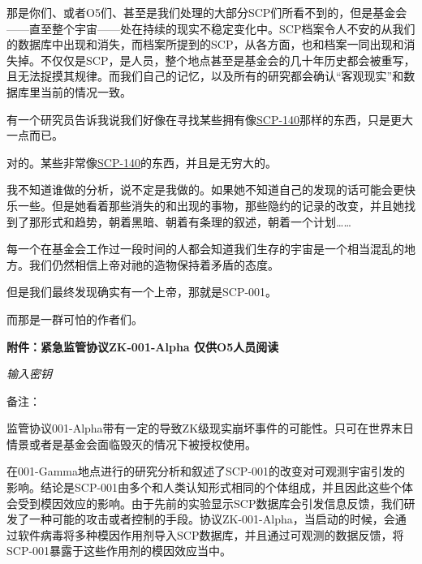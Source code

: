 \documentclass[openany,a4paper]{book} %
\begin{document}
\begin{colorboxed}
那是你们、或者O5们、甚至是我们处理的大部分SCP们所看不到的，但是基金会——直至整个宇宙——处在持续的现实不稳定变化中。SCP档案令人不安的从我们的数据库中出现和消失，而档案所提到的SCP，从各方面，也和档案一同出现和消失掉。不仅仅是SCP，是人员，整个地点甚至是基金会的几十年历史都会被重写，且无法捉摸其规律。而我们自己的记忆，以及所有的研究都会确认“客观现实”和数据库里当前的情况一致。\vspace{12pt}

有一个研究员告诉我说我们好像在寻找某些拥有像\hyperref[chap:SCP-140]{SCP-140}那样的东西，只是更大一点而已。\vspace{12pt}

对的。某些非常像\hyperref[chap:SCP-140]{SCP-140}的东西，并且是无穷大的。\vspace{12pt}

我不知道谁做的分析，说不定是我做的。如果她不知道自己的发现的话可能会更快乐一些。但是她看着那些消失的和出现的事物，那些隐约的记录的改变，并且她找到了那形式和趋势，朝着黑暗、朝着有条理的叙述，朝着一个计划……\vspace{12pt}

每一个在基金会工作过一段时间的人都会知道我们生存的宇宙是一个相当混乱的地方。我们仍然相信上帝对祂的造物保持着矛盾的态度。\vspace{12pt}

但是我们最终发现确实有一个上帝，那就是SCP-001。\vspace{12pt}

而那是一群可怕的作者们。
\upshape
\end{colorboxed}\vspace{36pt}

\textbf{附件：紧急监管协议ZK-001-Alpha 仅供O5人员阅读}\vspace{20pt}

\textit{输入密钥}\vspace{20pt}

备注：

监管协议001-Alpha带有一定的导致ZK级现实崩坏事件的可能性。只可在世界末日情景或者是基金会面临毁灭的情况下被授权使用。\vspace{20pt}

在001-Gamma地点进行的研究分析和叙述了SCP-001的改变对可观测宇宙引发的影响。结论是SCP-001由多个和人类认知形式相同的个体组成，并且因此这些个体会受到模因效应的影响。由于先前的实验显示SCP数据库会引发信息反馈，我们研发了一种可能的攻击或者控制的手段。协议ZK-001-Alpha，当启动的时候，会通过软件病毒将多种模因作用剂导入SCP数据库，并且通过可观测的数据反馈，将SCP-001暴露于这些作用剂的模因效应当中。\vspace{12pt}
\end{document}
